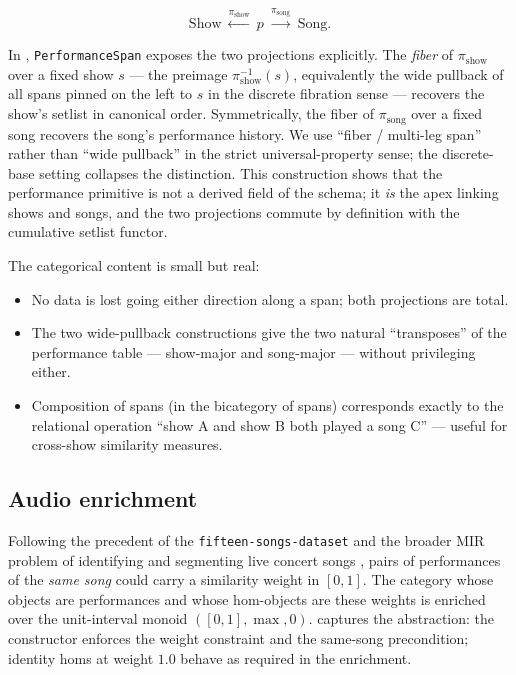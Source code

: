\documentclass[
]{article}
\providecommand{\tightlist}{%
  \setlength{\itemsep}{0pt}\setlength{\parskip}{0pt}}
\begin{document}
\[\mathrm{Show}\ \xleftarrow{\pi_{\text{show}}}\ p\ \xrightarrow{\pi_{\text{song}}}\ \mathrm{Song}.\]

In , \texttt{PerformanceSpan} exposes the two
projections explicitly. The \emph{fiber} of \(\pi_{\text{show}}\) over a
fixed show \(s\) --- the preimage \(\pi_{\text{show}}^{-1}(s)\),
equivalently the wide pullback of all spans pinned on the left to \(s\)
in the discrete fibration sense --- recovers the show's setlist in
canonical order. Symmetrically, the fiber of \(\pi_{\text{song}}\) over
a fixed song recovers the song's performance history. We use ``fiber /
multi-leg span'' rather than ``wide pullback'' in the strict
universal-property sense; the discrete-base setting collapses the
distinction. This construction shows that the performance primitive is
not a derived field of the schema; it \emph{is} the apex linking shows
and songs, and the two projections commute by definition with the
cumulative setlist functor.

The categorical content is small but real:

\begin{itemize}
\tightlist
\item
  No data is lost going either direction along a span; both projections
  are total.
\item
  The two wide-pullback constructions give the two natural
  ``transposes'' of the performance table --- show-major and song-major
  --- without privileging either.
\item
  Composition of spans (in the bicategory of spans) corresponds exactly
  to the relational operation ``show A and show B both played a song C''
  --- useful for cross-show similarity measures.
\end{itemize}

\subsection{Audio enrichment}\label{audio-enrichment}

Following the precedent of the \texttt{fifteen-songs-dataset}
\citep{fifteen_songs_dataset} and the broader MIR problem of identifying
and segmenting live concert songs \citep{wang_setlist_segmentation},
pairs of performances of the \emph{same song} could carry a similarity
weight in \([0, 1]\). The category whose objects are performances and
whose hom-objects are these weights is enriched over the unit-interval
monoid \(([0, 1], \max, 0)\).
 captures the
abstraction: the constructor enforces the weight constraint and the
same-song precondition; identity homs at weight \(1.0\) behave as
required in the enrichment.
\end{document}
